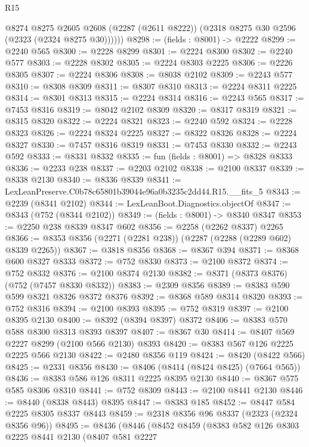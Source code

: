 \begin{lexlean}{R15}
\begin{coremodule}
        @8274
          @8275
          @2605
          @2608
          (@2287 (@2611 @8222))
          (@2318 @8275 @30 @2596 (@2323 (@2324 @8275 @30))))))
@8298 := (fields : @8001) -> @2222
@8299 := @2240 @565
@8300 := @2228 @8299
@8301 := @2224 @8300
@8302 := @2240 @577
@8303 := @2228 @8302
@8305 := @2224 @8303 @2225
@8306 := @2226 @8305
@8307 := @2224 @8306
@8308 := @8038 @2102
@8309 := @2243 @577
@8310 := @8308 @8309
@8311 := @8307 @8310
@8313 := @2224 @8311 @2225
@8314 := @8301 @8313
@8315 := @2224 @8314
@8316 := @2243 @565
@8317 := @7453 @8316
@8319 := @8042 @2102 @8309
@8320 := @8317 @8319
@8321 := @8315 @8320
@8322 := @2224 @8321
@8323 := @2240 @592
@8324 := @2228 @8323
@8326 := @2224 @8324 @2225
@8327 := @8322 @8326
@8328 := @2224 @8327
@8330 := @7457 @8316 @8319
@8331 := @7453 @8330
@8332 := @2243 @592
@8333 := @8331 @8332
@8335 := fun (fields : @8001) => @8328 @8333
@8336 := @2233 @238
@8337 := @2203 @2102
@8338 := @2100 @8337
@8339 := @8338 @2130
@8340 := @8336 @8339
@8341 := LexLeanPreserve.C0b78c65801b39044e96a0b3235c2dd44.R15.__fits_5
@8343 := @2239 (@8341 @2102)
@8344 := LexLeanBoot.Diagnostics.objectOf
@8347 := @8343 (@752 (@8344 @2102))
@8349 := (fields : @8001) -> @8340 @8347
@8353 := @2250 @238 @8339 @8347 @602
@8356 := @2258 (@2262 @8337) @2265
@8366 := @8353 @8356 (@2271 (@2281 @238)) (@2287 (@2288 (@2289 @602) @8339 @2265))
@8367 := @3818 @8356
@8368 := @8367 @394
@8371 := @8368 @600 @8327 @8333
@8372 := @752 @8330
@8373 := @2100 @8372
@8374 := @752 @8332
@8376 := @2100 @8374 @2130
@8382 := @8371 (@8373 @8376) (@752 (@7457 @8330 @8332))
@8383 := @2309 @8356
@8389 := @8383 @590 @599 @8321 @8326 @8372 @8376
@8392 := @8368 @589 @8314 @8320
@8393 := @752 @8316
@8394 := @2100 @8393
@8395 := @752 @8319
@8397 := @2100 @8395 @2130
@8400 := @8392 (@8394 @8397) @8372
@8406 := @8383 @570 @588 @8300 @8313 @8393 @8397
@8407 := @8367 @30
@8414 := @8407 @569 @2227 @8299 (@2100 @566 @2130) @8393
@8420 := @8383 @567 @126 @2225 @2225 @566 @2130
@8422 := @2480 @8356 @119
@8424 := @8420 (@8422 @566)
@8425 := @2331 @8356
@8430 := @8406 (@8414 (@8424 @8425) (@7664 @565))
@8436 := @8383 @586 @126 @8311 @2225 @8395 @2130
@8440 := @8367 @575 @585 @8306 @8310
@8441 := @752 @8309
@8443 := @2100 @8441 @2130
@8446 := @8440 (@8338 @8443) @8395
@8447 := @8383 @185
@8452 := @8447 @584 @2225 @8305 @8337 @8443
@8459 := @2318 @8356 @96 @8337 (@2323 (@2324 @8356 @96))
@8495 := @8436
    (@8446
      (@8452
        @8459
        (@8383
          @582
          @126
          @8303
          @2225
          @8441
          @2130
          (@8407
            @581
            @2227

\end{coremodule}
\end{lexlean}

